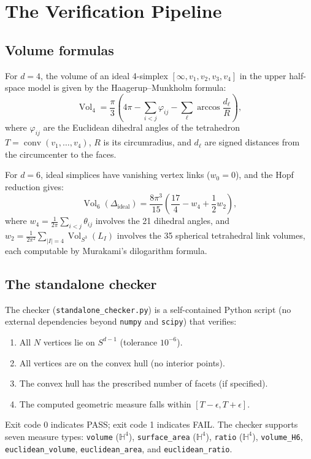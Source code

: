 \documentclass[11pt]{article}
\begin{document}
\section{The Verification Pipeline}
\label{sec:verification-pipeline}

\subsection{Volume formulas}

For $d = 4$, the volume of an ideal 4-simplex $[\infty, v_1, v_2, v_3, v_4]$
in the upper half-space model is given by the Haagerup--Munkholm formula:
\[
\operatorname{Vol}_4 = \frac{\pi}{3}
\left(4\pi - \sum_{i<j}\varphi_{ij} - \sum_\ell \arccos\frac{d_\ell}{R}\right),
\]
where $\varphi_{ij}$ are the Euclidean dihedral angles of the tetrahedron
$T = \operatorname{conv}(v_1,\ldots,v_4)$, $R$ is its circumradius, and
$d_\ell$ are signed distances from the circumcenter to the faces.

For $d = 6$, ideal simplices have vanishing vertex links ($w_0 = 0$),
and the Hopf reduction gives:
\[
\operatorname{Vol}_6(\Delta_{\mathrm{ideal}})
= \frac{8\pi^3}{15}\left(\frac{17}{4} - w_4 + \frac{1}{2}w_2\right),
\]
where $w_4 = \frac{1}{2\pi}\sum_{i<j}\theta_{ij}$ involves the 21 dihedral
angles, and $w_2 = \frac{1}{2\pi^2}\sum_{|I|=4}\operatorname{Vol}_{S^3}(L_I)$
involves the 35 spherical tetrahedral link volumes, each computable by
Murakami's dilogarithm formula.

\subsection{The standalone checker}

The checker (\texttt{standalone\_checker.py}) is a self-contained Python
script (no external dependencies beyond \texttt{numpy} and \texttt{scipy})
that verifies:
\begin{enumerate}
\item All $N$ vertices lie on $S^{d-1}$ (tolerance $10^{-6}$).
\item All vertices are on the convex hull (no interior points).
\item The convex hull has the prescribed number of facets (if specified).
\item The computed geometric measure falls within $[T-\epsilon, T+\epsilon]$.
\end{enumerate}
Exit code 0 indicates PASS; exit code 1 indicates FAIL.
The checker supports seven measure types: \texttt{volume} ($\mathbb{H}^4$),
\texttt{surface\_area} ($\mathbb{H}^4$), \texttt{ratio} ($\mathbb{H}^4$),
\texttt{volume\_H6}, \texttt{euclidean\_volume}, \texttt{euclidean\_area},
and \texttt{euclidean\_ratio}.
\end{document}
